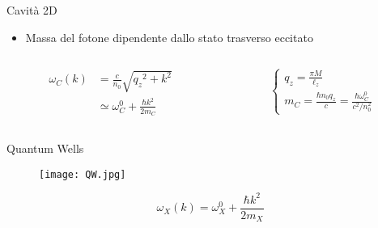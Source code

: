 \documentclass[10pt]{beamer}
\begin{document}
\begin{frame}{Cavità 2D}%

    \begin{figure}
    \end{figure}
    
    \begin{itemize}
     \item Massa del fotone dipendente dallo stato trasverso eccitato
    \end{itemize}
\vspace{-.5cm}        
      \begin{minipage}{\textwidth}
      \begin{columns}
	  \begin{column}{.5\textwidth}

	   \begin{align*}
	\omega_C(k) &= \frac{c}{n_0}\sqrt{{q_z}^2 + k^2} \\ 
		&\simeq \omega_C^0 + \frac{\hbar k^2}{2m_C}
	\end{align*}
	  \end{column}
	    
	  \begin{column}{.5\textwidth}
	  \footnotesize
	    $$\begin{cases}
	      q_z = \frac{\pi M}{\ell_z} \\
	      m_C = \frac{\hbar n_0 q_z}{c} = \frac{\hbar \omega_C^0}{c^2/n_0^2}
	    \end{cases}
	    $$
	   \end{column}
      \end{columns}

      \end{minipage}

  

    
\end{frame}

 \begin{frame}{Quantum Wells}
 
 \begin{figure}
  \texttt{[image: QW.jpg]}
 \end{figure}
  $$\omega_X(k) = \omega_X^0 + \frac{\hbar k^2}{2m_X}$$
  \end{frame}

 
\end{document}
